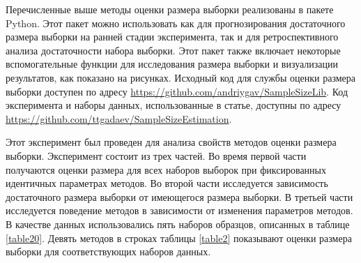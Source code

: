 Перечисленные выше методы оценки размера выборки реализованы в пакете Python. Этот пакет можно использовать как для прогнозирования достаточного размера выборки на ранней стадии эксперимента, так и для ретроспективного анализа достаточности набора выборки. Этот пакет также включает некоторые вспомогательные функции для исследования размера выборки и визуализации результатов, как показано на рисунках. Исходный код для службы оценки размера выборки доступен по адресу \mbox{\url{https://github.com/andriygav/SampleSizeLib}}. Код эксперимента и наборы данных, использованные в статье, доступны по адресу \mbox{\url{https://github.com/ttgadaev/SampleSizeEstimation}}.

Этот эксперимент был проведен для анализа свойств методов оценки размера выборки. Эксперимент состоит из трех частей. Во время первой части получаются оценки размера для всех наборов выборок при фиксированных идентичных параметрах методов. Во второй части исследуется зависимость достаточного размера выборки от имеющегося размера выборки. В третьей части исследуется поведение методов в зависимости от изменения параметров методов. В качестве данных использовались пять наборов образцов, описанных в таблице \ref{table20}. Девять методов в строках таблицы \ref{table2} показывают оценки размера выборки для соответствующих наборов данных.
 
\begin{table}[!hbp]
\centering
\caption{Эксперимент по оценке размера выборки для различных наборов выборок}
\label{table2}
\end{table}

